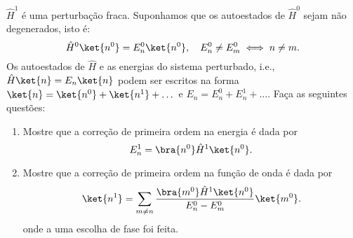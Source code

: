 \begin{enumerate}
          $\hat{H}^1$ é uma perturbação fraca.  Suponhamos que os autoestados de
          $\hat{H}^0$ sejam não degenerados, isto é:
          \begin{equation*}
              \hat{H}^0\ket{n^0} = E_n^0\ket{n^0},\quad E^0_n \neq E^0_m \iff n \neq m.
          \end{equation*}
          Os autoestados de $\hat{H}$ e as energias do sistema perturbado, i.e.,
          $\hat{H}\ket{n}=E_n\ket{n}$ podem ser escritos na forma $\ket{n} = \ket{n^0} +
              \ket{n^1} + \dots$ e $E_n = E_n^0 + E_n^1 + \dots$.
          Faça as seguintes questões:
          \begin{enumerate}
              \item Mostre que a correção de primeira ordem na energia é dada por
                    \begin{equation*}
                        E_n^1 = \bra{n^0}\hat{H}^1\ket{n^0}.
                    \end{equation*}
              \item Mostre que a correção de primeira ordem na função de onda é dada por
                    \begin{equation*}
                        \ket{n^1} = \sum_{m\neq n}\frac{\bra{m^0}\hat{H}^1\ket{n^0}}{E_n^0 - E_m^0}\ket{m^0}.
                    \end{equation*}
                    onde a uma escolha de fase foi feita.
          \end{enumerate}

\end{enumerate}

